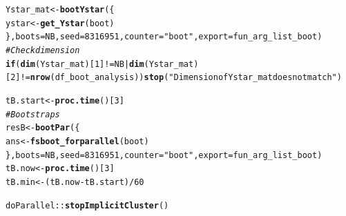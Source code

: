 \documentclass[9pt]{article}\usepackage[]{graphicx}\usepackage[]{xcolor}
\makeatletter
\newcommand{\hlnum}[1]{\textcolor[rgb]{0.686,0.059,0.569}{#1}}%
\newcommand{\hlstr}[1]{\textcolor[rgb]{0.192,0.494,0.8}{#1}}%
\newcommand{\hlcom}[1]{\textcolor[rgb]{0.678,0.584,0.686}{\textit{#1}}}%
\newcommand{\hlopt}[1]{\textcolor[rgb]{0,0,0}{#1}}%
\newcommand{\hlstd}[1]{\textcolor[rgb]{0.345,0.345,0.345}{#1}}%
\newcommand{\hlkwa}[1]{\textcolor[rgb]{0.161,0.373,0.58}{\textbf{#1}}}%
\newcommand{\hlkwb}[1]{\textcolor[rgb]{0.69,0.353,0.396}{#1}}%
\newcommand{\hlkwc}[1]{\textcolor[rgb]{0.333,0.667,0.333}{#1}}%
\newcommand{\hlkwd}[1]{\textcolor[rgb]{0.737,0.353,0.396}{\textbf{#1}}}%
\newenvironment{kframe}{%
 \def\at@end@of@kframe{}%
 \ifinner\ifhmode%
  \def\at@end@of@kframe{\end{minipage}}%
  \begin{minipage}{\columnwidth}%
 \fi\fi%
 \def\FrameCommand##1{\hskip\@totalleftmargin \hskip-\fboxsep
 \colorbox{shadecolor}{##1}\hskip-\fboxsep
     \hskip-\linewidth \hskip-\@totalleftmargin \hskip\columnwidth}%
 \MakeFramed {\advance\hsize-\width
   \@totalleftmargin\z@ \linewidth\hsize
   \@setminipage}}%
 {\par\unskip\endMakeFramed%
 \at@end@of@kframe}
\newenvironment{knitrout}{}{} %
\theoremstyle{definition}
\theoremstyle{remark}
\makeatother
\begin{document}
\begin{knitrout}
\begin{kframe}
\begin{alltt}
\hlstd{Ystar_mat} \hlkwb{<-} \hlkwd{bootYstar}\hlstd{(\{}
    \hlstd{ystar} \hlkwb{<-} \hlkwd{get_Ystar}\hlstd{(boot)}
\hlstd{\},} \hlkwc{boots} \hlstd{= NB,} \hlkwc{seed} \hlstd{=} \hlnum{8316951}\hlstd{,} \hlkwc{counter} \hlstd{=} \hlstr{"boot"}\hlstd{,} \hlkwc{export} \hlstd{= fun_arg_list_boot)}
\hlcom{# Check dimension}
\hlkwa{if} \hlstd{(}\hlkwd{dim}\hlstd{(Ystar_mat)[}\hlnum{1}\hlstd{]} \hlopt{!=} \hlstd{NB} \hlopt{|} \hlkwd{dim}\hlstd{(Ystar_mat)[}\hlnum{2}\hlstd{]} \hlopt{!=} \hlkwd{nrow}\hlstd{(df_boot_analysis))} \hlkwd{stop}\hlstd{(}\hlstr{"Dimension of Ystar_mat does not match"}\hlstd{)}

\hlstd{tB.start} \hlkwb{<-} \hlkwd{proc.time}\hlstd{()[}\hlnum{3}\hlstd{]}
\hlcom{# Bootstraps}
\hlstd{resB} \hlkwb{<-} \hlkwd{bootPar}\hlstd{(\{}
    \hlstd{ans} \hlkwb{<-} \hlkwd{fsboot_forparallel}\hlstd{(boot)}
\hlstd{\},} \hlkwc{boots} \hlstd{= NB,} \hlkwc{seed} \hlstd{=} \hlnum{8316951}\hlstd{,} \hlkwc{counter} \hlstd{=} \hlstr{"boot"}\hlstd{,} \hlkwc{export} \hlstd{= fun_arg_list_boot)}
\hlstd{tB.now} \hlkwb{<-} \hlkwd{proc.time}\hlstd{()[}\hlnum{3}\hlstd{]}
\hlstd{tB.min} \hlkwb{<-} \hlstd{(tB.now} \hlopt{-} \hlstd{tB.start)}\hlopt{/}\hlnum{60}

\hlstd{doParallel}\hlopt{::}\hlkwd{stopImplicitCluster}\hlstd{()}


\end{alltt}
\end{kframe}
\end{knitrout}
\end{document}
